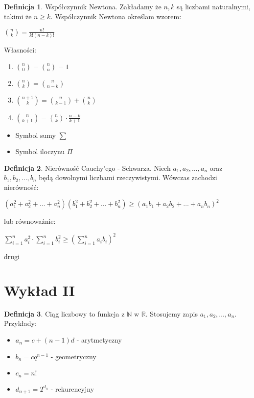 \documentclass{article}
\theoremstyle{definition}
\newtheorem{de}{Definicja}[subsection]
\theoremstyle{definition}
\theoremstyle{definition}
\theoremstyle{definition}
\begin{document}
\begin{de}
    Współczynnik Newtona. Zakładamy że $n,k$ są liczbami naturalnymi,
    takimi że $n\geq k$. Współczynnik Newtona określam wzorem:
    \begin{center}
        $\binom{n}{k}=\frac{n!}{k!(n-k)!}$
    \end{center}
    Własności:
    \begin{enumerate}
        \item $\binom{n}{0}=\binom{n}{n}=1$
        \item $\binom{n}{k}=\binom{n}{n-k}$
        \item $\binom{n+1}{k}=\binom{n}{k-1}+\binom{n}{k}$
        \item $\binom{n}{k+1}=\binom{n}{k}\cdot \frac{n-k}{k+1}$
    \end{enumerate}
\end{de}

\begin{itemize}
    \item Symbol sumy $\sum$
    \item Symbol iloczynu $\Pi$
\end{itemize}

\begin{de}
    Nierówność Cauchy'ego - Schwarza. Niech $a_1, a_2, \dots, a_n$ oraz $b_1, b_2, \dots, b_n$ będą dowolnymi liczbami rzeczywistymi.
    Wówczas zachodzi nierówność:
    \begin{center}
        $(a_1^2+a_2^2+\dots+a_n^2)(b_1^2+b_2^2+\dots+b_n^2)\geq(a_1b_1+a_2b_2+\dots+a_nb_n)^2$
    \end{center}
    lub równoważnie:
    \begin{center}
        $\sum_{i=1}^{n} a_i^2 \cdot \sum_{i=1}^{n} b_i^2 \geq \left(\sum_{i=1}^{n} a_ib_i\right)^2$
    \end{center}
\end{de}
drugi
\section{Wykład II}

\begin{de}
    Ciąg liczbowy to funkcja z $\mathbb{N}$ w $\mathbb{R}$. Stosujemy zapis $a_1,a_2,\dots,a_n$. Przykłady:
    \begin{itemize}
        \item $a_n=c+(n-1)d$ - arytmetyczny
        \item $b_n=cq^{n-1}$ - geometryczny
        \item $c_n=n!$
        \item $d_{n+1}=2^{d_n}$ - rekurencyjny
    \end{itemize}
\end{de}
\end{document}

